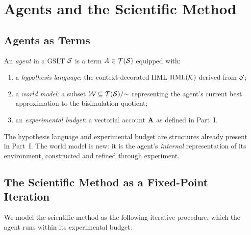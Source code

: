 \chapter{Agents and the Scientific Method}
\label{sec:agents}

\section{Agents as Terms}

\begin{definition}[Agent]
An \emph{agent} in a GSLT $\mathcal{S}$ is a term $A \in \mathcal{T}(\mathcal{S})$
equipped with:
\begin{enumerate}[label=(\roman*)]
  \item a \emph{hypothesis language}: the context-decorated
        HML $\mathrm{HML}(\mathcal{K})$ derived from $\mathcal{S}$;
  \item a \emph{world model}: a subset $\mathcal{W} \subseteq
        \mathcal{T}(\mathcal{S})/{\sim}$ representing the agent's current
        best approximation to the bisimulation quotient;
  \item an \emph{experimental budget}: a vectorial account
        $\mathbf{A}$ as defined in Part~I.
\end{enumerate}
\end{definition}

\begin{remark}
The hypothesis language and experimental budget are structures
already present in Part~I.
The world model is new: it is the agent's \emph{internal} representation
of its environment, constructed and refined through experiment.
\end{remark}

\section{The Scientific Method as a Fixed-Point Iteration}

We model the scientific method as the following iterative procedure,
which the agent runs within its experimental budget:

